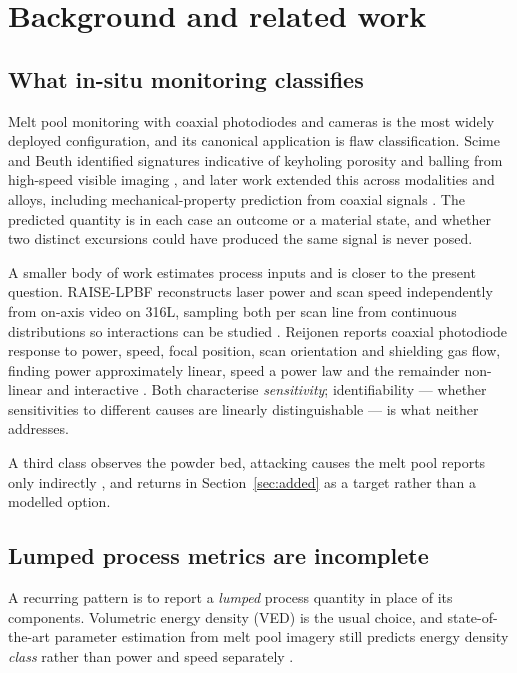 \documentclass[preprint,times]{elsarticle}
\begin{document}
\section{Background and related work}

\subsection{What in-situ monitoring classifies}

Melt pool monitoring with coaxial photodiodes and cameras is the most widely
deployed configuration, and its canonical application is flaw classification.
Scime and Beuth identified signatures indicative of keyholing porosity and
balling from high-speed visible imaging \cite{Scime2019}, and later work extended
this across modalities and alloys, including mechanical-property prediction from
coaxial signals \cite{Raj2023}. The predicted quantity is in each case an outcome
or a material state, and whether two distinct excursions could have produced the
same signal is never posed.

A smaller body of work estimates process inputs and is closer to the present
question. RAISE-LPBF reconstructs laser power and scan speed independently from
on-axis video on 316L, sampling both per scan line from continuous distributions
so interactions can be studied \cite{Blanc2024}. Reijonen reports coaxial
photodiode response to power, speed, focal position, scan orientation and
shielding gas flow, finding power approximately linear, speed a power law and the
remainder non-linear and interactive \cite{Reijonen2024}. Both characterise
\emph{sensitivity}; identifiability --- whether sensitivities to different causes
are linearly distinguishable --- is what neither addresses.

A third class observes the powder bed, attacking causes the melt pool reports
only indirectly \cite{Liu2022,Bugatti2022}, and returns in
Section~\ref{sec:added} as a target rather than a modelled option.

\subsection{Lumped process metrics are incomplete}

A recurring pattern is to report a \emph{lumped} process quantity in place of its
components. Volumetric energy density (VED) is the usual choice, and
state-of-the-art parameter estimation from melt pool imagery still predicts
energy density \emph{class} rather than power and speed separately \cite{kNN2025}.
\end{document}
